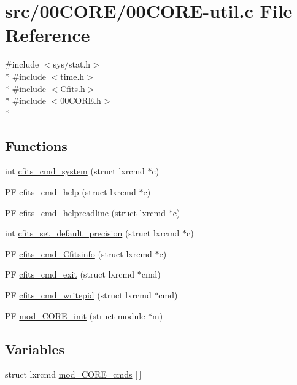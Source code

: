 \hypertarget{src_200CORE_200CORE-util_8c}{\section{src/00\+C\+O\+R\+E/00\+C\+O\+R\+E-\/util.c File Reference}
\label{src_200CORE_200CORE-util_8c}
}
{\ttfamily \#include $<$sys/stat.\+h$>$}\\*
{\ttfamily \#include $<$time.\+h$>$}\\*
{\ttfamily \#include $<$Cfits.\+h$>$}\\*
{\ttfamily \#include $<$00\+C\+O\+R\+E.\+h$>$}\\*
\subsection*{Functions}
\begin{DoxyCompactItemize}
\item 
int \hyperlink{src_200CORE_200CORE-util_8c_a5c347013d2321007a39b35479a004a98}{cfits\+\_\+cmd\+\_\+system} (struct lxrcmd $\ast$c)
\item 
P\+F \hyperlink{src_200CORE_200CORE-util_8c_adcad0b09bdc39ca886929037370e91e3}{cfits\+\_\+cmd\+\_\+help} (struct lxrcmd $\ast$c)
\item 
P\+F \hyperlink{src_200CORE_200CORE-util_8c_aae63cebb1c60093a659435e992688824}{cfits\+\_\+cmd\+\_\+helpreadline} (struct lxrcmd $\ast$c)
\item 
int \hyperlink{src_200CORE_200CORE-util_8c_a5c512f9b46240c62c5d4efee9a2585ec}{cfits\+\_\+set\+\_\+default\+\_\+precision} (struct lxrcmd $\ast$c)
\item 
P\+F \hyperlink{src_200CORE_200CORE-util_8c_a9f914b00beb9aca409d72a7e61b35cd8}{cfits\+\_\+cmd\+\_\+\+Cfitsinfo} (struct lxrcmd $\ast$c)
\item 
P\+F \hyperlink{src_200CORE_200CORE-util_8c_a71ac14b0fd01ac9ec195dfaf9770051f}{cfits\+\_\+cmd\+\_\+exit} (struct lxrcmd $\ast$cmd)
\item 
P\+F \hyperlink{src_200CORE_200CORE-util_8c_a73a58102b0bf4d2351ab96a614a25e87}{cfits\+\_\+cmd\+\_\+writepid} (struct lxrcmd $\ast$cmd)
\item 
P\+F \hyperlink{src_200CORE_200CORE-util_8c_a41cdcd744da71a393cd0174d3554213b}{mod\+\_\+C\+O\+R\+E\+\_\+init} (struct module $\ast$m)
\end{DoxyCompactItemize}
\subsection*{Variables}
\begin{DoxyCompactItemize}
\item 
struct lxrcmd \hyperlink{src_200CORE_200CORE-util_8c_a30a1fdbdb3486e487be580824d331721}{mod\+\_\+C\+O\+R\+E\+\_\+cmds} \mbox{[}$\,$\mbox{]}
\end{DoxyCompactItemize}


